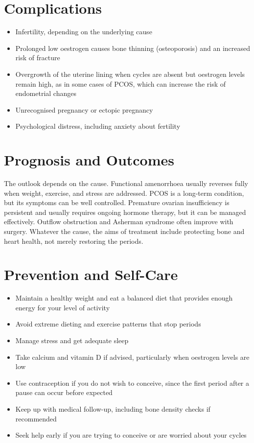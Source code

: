 \section*{Complications}
\begin{itemize}
    \item Infertility, depending on the underlying cause
    \item Prolonged low oestrogen causes bone thinning (osteoporosis) and an increased risk of fracture
    \item Overgrowth of the uterine lining when cycles are absent but oestrogen levels remain high, as in some cases of PCOS, which can increase the risk of endometrial changes
    \item Unrecognised pregnancy or ectopic pregnancy
    \item Psychological distress, including anxiety about fertility
\end{itemize}

\section*{Prognosis and Outcomes}
The outlook depends on the cause. Functional amenorrhoea usually reverses fully when weight, exercise, and stress are addressed. PCOS is a long-term condition, but its symptoms can be well controlled. Premature ovarian insufficiency is persistent and usually requires ongoing hormone therapy, but it can be managed effectively. Outflow obstruction and Asherman syndrome often improve with surgery. Whatever the cause, the aims of treatment include protecting bone and heart health, not merely restoring the periods.

\section*{Prevention and Self-Care}
\begin{itemize}
    \item Maintain a healthy weight and eat a balanced diet that provides enough energy for your level of activity
    \item Avoid extreme dieting and exercise patterns that stop periods
    \item Manage stress and get adequate sleep
    \item Take calcium and vitamin D if advised, particularly when oestrogen levels are low
    \item Use contraception if you do not wish to conceive, since the first period after a pause can occur before expected
    \item Keep up with medical follow-up, including bone density checks if recommended
    \item Seek help early if you are trying to conceive or are worried about your cycles
\end{itemize}

